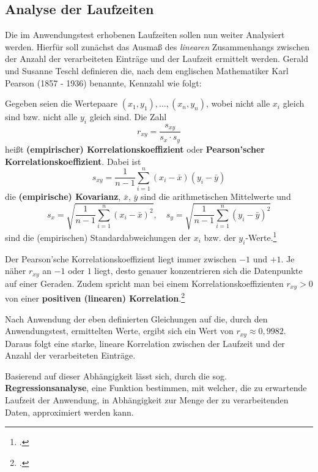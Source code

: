 \subsection{Analyse der Laufzeiten}
Die im Anwendungstest erhobenen Laufzeiten sollen nun weiter Analysiert werden. Hierfür soll zunächst das Ausmaß des \textit{linearen} Zusammenhangs zwischen der Anzahl der verarbeiteten Einträge und der Laufzeit ermittelt werden. Gerald und Susanne Teschl definieren die, nach dem englischen Mathematiker Karl Pearson (1857 - 1936) benannte, Kennzahl wie folgt:

\flqq Gegeben seien die Wertepaare $(x_1,y_1), \dots,(x_n,y_n)$, wobei nicht alle $x_i$ gleich sind bzw. nicht alle $y_i$ gleich sind. Die Zahl
\begin{equation*}
r_{xy} = \frac{s_{xy}}{s_x \cdot s_y}
\end{equation*} 
heißt \textbf{(empirischer) Korrelationskoeffizient} oder \textbf{Pearson'scher Korrelationskoeffizient}. Dabei ist
\begin{equation*}
s_{xy} = \frac{1}{n-1} \displaystyle\sum_{i=1}^{n} (x_i - \bar{x})(y_i - \bar{y})
\end{equation*}
die \textbf{(empirische) Kovarianz}, $\bar{x}$, $\bar{y}$ sind die arithmetischen Mittelwerte und
\begin{equation*}
s_x = \sqrt{\frac{1}{n-1} \displaystyle\sum_{i=1}^{n} (x_i - \bar{x})^2}, \quad s_y = \sqrt{\frac{1}{n-1} \displaystyle\sum_{i=1}^{n} (y_i - \bar{y})^2}
\end{equation*}
sind die (empirischen) Standardabweichungen der $x_i$ bzw. der $y_i$-Werte.\frqq\footcite[S. 213]{Teschl.2014}

Der Pearson'sche Korrelationskoeffizient liegt immer zwischen $-1$ und $+1$. Je näher $r_{xy}$ an $-1$ oder $1$ liegt, desto genauer konzentrieren sich die Datenpunkte auf einer Geraden. Zudem spricht man bei einem Korrelationskoeffizienten $r_{xy}>0$ von einer \textbf{positiven (linearen) Korrelation}.\footcite[Vgl.][S. 214]{Teschl.2014}

Nach Anwendung der eben definierten Gleichungen auf die, durch den Anwendungstest, ermittelten Werte, ergibt sich ein Wert von $r_{xy} \approx 0,9982$. Daraus folgt eine starke, lineare Korrelation zwischen der Laufzeit und der Anzahl der verarbeiteten Einträge.

Basierend auf dieser Abhängigkeit lässt sich, durch die sog. \textbf{Regressionsanalyse}, eine Funktion bestimmen, mit welcher, die zu erwartende Laufzeit der Anwendung, in Abhängigkeit zur Menge der zu verarbeitenden Daten, approximiert werden kann.

